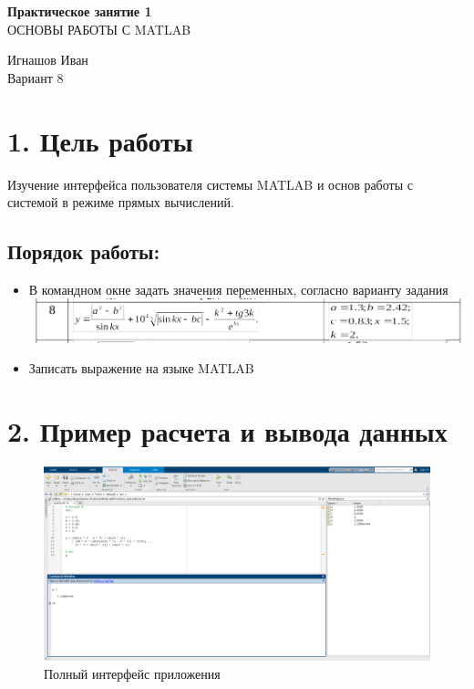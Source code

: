 \documentclass[12pt]{article}
\begin{document}
\begin{center}
	\LARGE 
	\textbf{Практическое занятие 1}\\
	ОСНОВЫ РАБОТЫ С MATLAB\\
\end{center}

\begin{flushright}
	\large
	Игнашов Иван\\
	Вариант 8\\
\end{flushright}



\newpage

 \section*{1. Цель работы}
Изучение интерфейса пользователя системы MATLAB и основ работы с системой в режиме прямых вычислений.
\subsection*{Порядок работы:}
\begin{itemize}
	\item В командном окне задать значения переменных, согласно варианту задания\\
	\includegraphics[width=\linewidth]{formula.png}
	
	\item Записать выражение на языке MATLAB
\end{itemize}


 \section*{2. Пример расчета и вывода данных}%
 
\begin{figure}[!h]
	\centering
	\includegraphics[width=0.75\linewidth]{full.png}
	\caption{Полный интерфейс приложения}
\end{figure}
\end{document}
